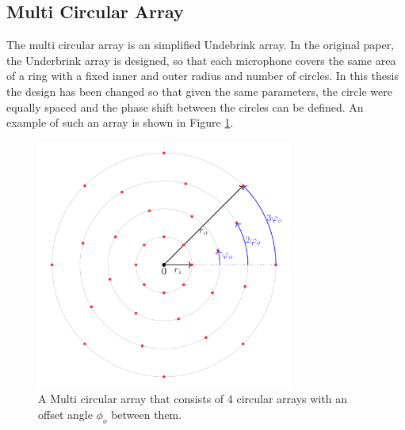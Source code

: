 
\subsection{Multi Circular Array}
The multi circular array is an simplified Undebrink array.
In the original paper, the Underbrink array is designed, so that each
microphone covers the same area of a ring with a fixed inner and outer radius and number of circles.
In this thesis the design has been changed so that given the same parameters,
the circle were equally spaced and the phase shift between the circles can be defined.
An example of such an array is shown in Figure \ref{aev:fig:FancyArr}.
\begin{figure}[h!]
	\centering
	\includegraphics[width=0.75\textwidth]{images/5_array_evaluation/fancy_arr.pdf}
	\caption{A Multi circular array that consists of 4 circular arrays
		with an offset angle $\phi_o$ between them.}
	\label{aev:fig:FancyArr}
\end{figure}
\newpage


